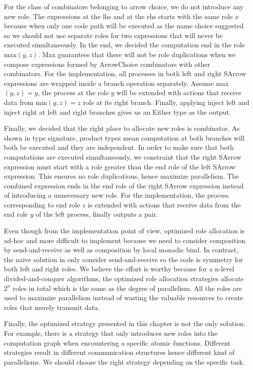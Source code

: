 For the class of combinators belonging to arrow choice, we do not introduce any new role. The expressions at the lhs and at the rhs starts with the same role $x$ because when only one code path will be executed as the name choice suggested so we should not use separate roles for two expressions that will never be executed simultaneously. In the end, we decided the computation end in the role max$(y,z)$. Max guarantees that there will not be role duplications when we compose expressions formed by ArrowChoice combinators with other combinators. For the implementation, all processes in both left and right SArrow expressions are wrapped inside a branch operation separately. Assume max$(y, z) = y$, the process at the role $y$ will be extended with actions that receive data from min$(y, z) = z$ role at its right branch. Finally, applying inject left and inject right at left and right branches gives us an Either type as the output.

Finally, we decided that the right place to allocate new roles is \hask{&&&} combinator. As shown in type signature, product types mean computation at both branches will both be executed and they are independent. In order to make sure that both computations are executed simultaneously, we constraint that the right SArrow expression must start with a role greater than the end role of the left SArrow expression. This ensures no role duplications, hence maximize parallelism. The combined expression ends in the end role of the right SArrow expression instead of introducing a unnecessary new role. For the implementation, the process corresponding to end role $z$ is extended with actions that receive data from the end role $y$ of the left process, finally outputs a pair.

Even though from the implementation point of view, optimized role allocation is ad-hoc and more difficult to implement because we need to consider composition by send-and-receive as well as composition by local monadic bind. In contrast, the naive solution in  only consider send-and-receive so the code is symmetry for both left and right roles. We believe the effort is worthy because for a n-level divided-and-conquer algorithms, the optimized role allocation strategies allocate $2^n$ roles in total which is the same as the degree of parallelism. All the roles are used to maximize parallelism instead of wasting the valuable resources to create roles that merely transmit data.

Finally, the optimized strategy presented in this chapter is not the only solution. For example, there is a strategy that only introduces new roles into the computation graph when encountering a specific atomic functions. Different strategies result in different communication structures hence different kind of parallelisms. We should choose the right strategy depending on the specific task.
